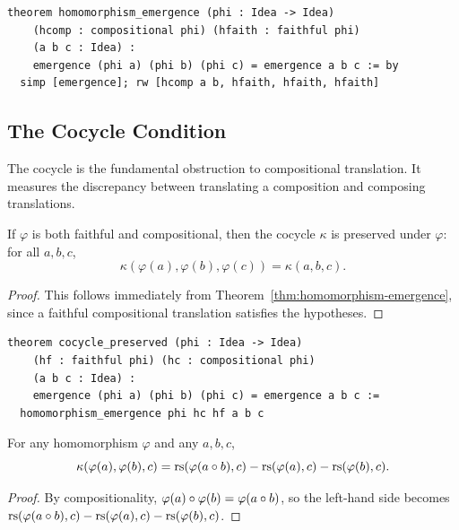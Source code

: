 \begin{lstlisting}
theorem homomorphism_emergence (phi : Idea -> Idea)
    (hcomp : compositional phi) (hfaith : faithful phi)
    (a b c : Idea) :
    emergence (phi a) (phi b) (phi c) = emergence a b c := by
  simp [emergence]; rw [hcomp a b, hfaith, hfaith, hfaith]
\end{lstlisting}

\subsection{The Cocycle Condition}

The cocycle is the fundamental obstruction to compositional translation.
It measures the discrepancy between translating a composition and composing
translations.

\begin{theorem}
\label{thm:cocycle-preserved}
If $\varphi$ is both faithful and compositional, then the cocycle
$\kappa$ is preserved under $\varphi$: for all $a, b, c$,
\[
  \kappa(\varphi(a), \varphi(b), \varphi(c)) = \kappa(a, b, c).
\]
\end{theorem}

\begin{proof}
This follows immediately from Theorem~\ref{thm:homomorphism-emergence},
since a faithful compositional translation satisfies the hypotheses.
\end{proof}

\begin{lstlisting}
theorem cocycle_preserved (phi : Idea -> Idea)
    (hf : faithful phi) (hc : compositional phi)
    (a b c : Idea) :
    emergence (phi a) (phi b) (phi c) = emergence a b c :=
  homomorphism_emergence phi hc hf a b c
\end{lstlisting}

\begin{theorem}
\label{thm:homomorphism-cocycle}
For any homomorphism $\varphi$ and any $a, b, c$,
\[
  \kappa(\varphi(a), \varphi(b), c)
    = \mathrm{rs}(\varphi(a \circ b), c) - \mathrm{rs}(\varphi(a), c) - \mathrm{rs}(\varphi(b), c).
\]
\end{theorem}

\begin{proof}
By compositionality, $\varphi(a) \circ \varphi(b) = \varphi(a \circ b)$,
so the left-hand side becomes
$\mathrm{rs}(\varphi(a \circ b), c) - \mathrm{rs}(\varphi(a), c) - \mathrm{rs}(\varphi(b), c)$.
\end{proof}

